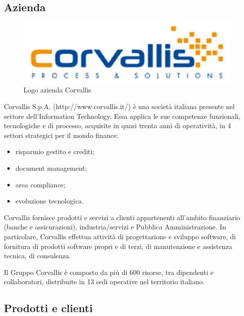 \subsection{Azienda}
\label{1.1}

\begin{figure}[h!]
\centering
\includegraphics[scale=0.75]{../Logo&Header/logoCorvallis.png}
\caption{ Logo azienda Corvallis}
\end{figure}

Corvallis S.p.A. (http://www.corvallis.it/) è una società italiana presente nel settore dell’Information Technology. Essa applica le sue competenze funzionali, tecnologiche e di processo, acquisite in quasi trenta anni di operatività, in 4 settori strategici per il mondo finance:
\begin{itemize}

\item risparmio gestito e crediti;
\item document management;
\item area compliance;
\item evoluzione tecnologica.\\
\end{itemize}

Corvallis fornisce prodotti e servizi a clienti appartenenti all'ambito finanziario (banche e assicurazioni), industria/servizi e Pubblica Amministrazione. In particolare, Corvallis effettua attività di progettazione e sviluppo software, di fornitura di prodotti software propri e di terzi, di manutenzione e assistenza tecnica, di consulenza.

Il Gruppo Corvallis è composto da più di 600 risorse, tra dipendenti e collaboratori, distribuite in 13 sedi operative nel territorio italiano.

\subsection{Prodotti e clienti}
\label{1.2}
